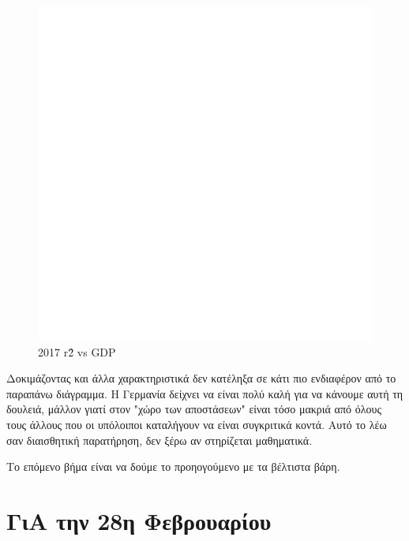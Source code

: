 \documentclass[a4paper,twoside,10pt]{article}
\begin{document}
	\begin{figure}[H]
		\centering
		\includegraphics[width = \textwidth]{images/2017 r^2 vs GDP.png}
		\caption{2017 r\^2 vs GDP}
		\label{fig:/2017 r^2 vs GDP}
	\end{figure}
	
	Δοκιμάζοντας και άλλα χαρακτηριστικά δεν κατέληξα σε κάτι πιο ενδιαφέρον από το παραπάνω διάγραμμα. Η Γερμανία δείχνει να είναι πολύ καλή για να κάνουμε αυτή τη δουλειά, μάλλον γιατί στον "χώρο των αποστάσεων" είναι τόσο μακριά από όλους τους άλλους που οι υπόλοιποι καταλήγουν να είναι συγκριτικά κοντά. Αυτό το λέω σαν διαισθητική παρατήρηση, δεν ξέρω αν στηρίζεται μαθηματικά. 
	
	Το επόμενο βήμα είναι να δούμε το προηογούμενο με τα βέλτιστα βάρη. 
	
	\section{ΓιΑ την 28η Φεβρουαρίου}
	
\end{document}
